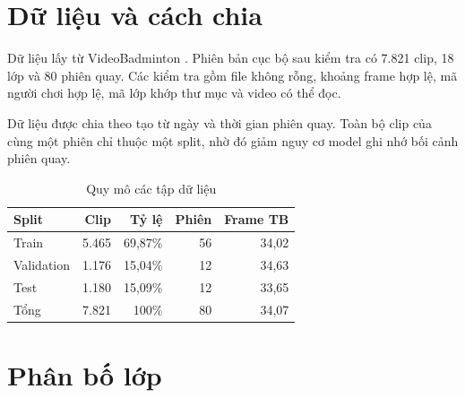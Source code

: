 \documentclass[12pt,a4paper,oneside]{report}
\newcommand{\code}[1]{\texttt{\detokenize{#1}}}
\begin{document}
\section{Dữ liệu và cách chia}

Dữ liệu lấy từ VideoBadminton \cite{videobadminton}. Phiên bản cục bộ sau kiểm tra có 7.821 clip, 18 lớp và 80 phiên quay. Các kiểm tra gồm file không rỗng, khoảng frame hợp lệ, mã người chơi hợp lệ, mã lớp khớp thư mục và video có thể đọc.

Dữ liệu được chia theo \code{source_id} tạo từ ngày và thời gian phiên quay. Toàn bộ clip của cùng một phiên chỉ thuộc một split, nhờ đó giảm nguy cơ model ghi nhớ bối cảnh phiên quay.

\begin{table}[H]
\centering
\caption{Quy mô các tập dữ liệu}
\begin{tabular}{lrrrr}
\toprule
\textbf{Split} & \textbf{Clip} & \textbf{Tỷ lệ} & \textbf{Phiên} & \textbf{Frame TB}\\
\midrule
Train & 5.465 & 69,87\% & 56 & 34,02\\
Validation & 1.176 & 15,04\% & 12 & 34,63\\
Test & 1.180 & 15,09\% & 12 & 33,65\\
\midrule
Tổng & 7.821 & 100\% & 80 & 34,07\\
\bottomrule
\end{tabular}
\end{table}

\section{Phân bố lớp}
\end{document}
